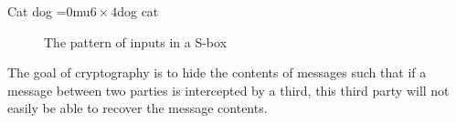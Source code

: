 \documentclass{article}
\begin{document}
Cat dog \begingroup\medmuskip=0mu\relax$6 \times 4$\endgroup dog cat

\begin{figure}
    \centering
    
    \caption{The pattern of inputs in a S-box}
    \label{fig:bitpattern}
\end{figure}
The goal of cryptography is to hide the contents of messages such that if a message between two parties is intercepted by a third, this third party will not easily be able to recover the message contents.
\end{document}

